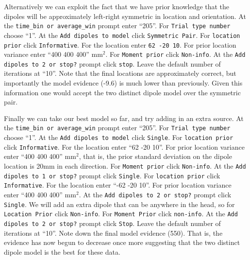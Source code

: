 Alternatively we can exploit the fact that we have prior knowledge that the dipoles will be approximately left-right symmetric in location and orientation. At the \texttt{time\_bin or average\_win} prompt enter ``205''.  For \texttt{Trial type number} choose ``1''. At the \texttt{Add dipoles to model} click \texttt{Symmetric Pair}. For \texttt{location prior} click \texttt{Informative}. For the location enter \texttt{62 -20 10}. For prior location variance enter ``400 400 400'' mm$^2$. For \texttt{Moment prior} click \texttt{Non-info}. At the \texttt{Add dipoles to 2 or stop?} prompt click \texttt{stop}. Leave the default number of iterations at ``10''. Note that the final locations are approximately correct, but importantly the model evidence (-9.6) is much lower than previously. Given this information one would accept the two distinct dipole model over the symmetric pair. 

Finally we can take our best model so far, and try adding in an extra source.
At the \texttt{time\_bin or average\_win} prompt enter ``205''. For \texttt{Trial type number} choose ``1''. At the \texttt{Add dipoles to model} click \texttt{Single}. For \texttt{location prior} click \texttt{Informative}. For the location enter ``62 -20 10''. For prior location variance enter ``400 400 400'' mm$^2$, that is, the prior standard deviation on the dipole location is 20mm in each direction. For \texttt{Moment prior} click \texttt{Non-info}. At the \texttt{Add dipoles to 1 or stop?} prompt click \texttt{Single}. For \texttt{location prior} click \texttt{Informative}. For the location enter ``-62 -20 10''. For prior location variance enter ``400 400 400'' mm$^2$. At the \texttt{Add dipoles to 2 or stop?} prompt click \texttt{Single}. We will add an extra dipole that can be anywhere in the head, so for \texttt{Location Prior} click \texttt{Non-info}. For \texttt{Moment Prior} click \texttt{non-info}. At the \texttt{Add dipoles to 2 or stop?} prompt click \texttt{Stop}. Leave the default number of iterations at ``10''. Note down the final model evidence (550). That is, the evidence has now begun to decrease once more suggesting that the two distinct dipole model is the best for these data.

